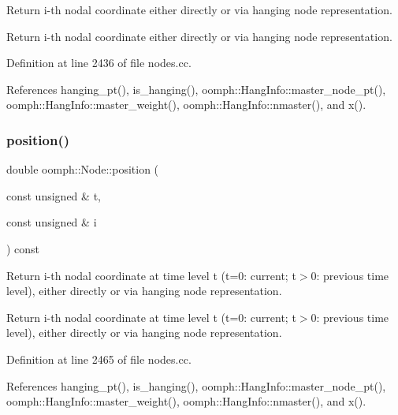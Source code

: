 Return i-\/th nodal coordinate either directly or via hanging node representation. 

Return i-\/th nodal coordinate either directly or via hanging node representation. 

Definition at line 2436 of file nodes.\+cc.



References hanging\+\_\+pt(), is\+\_\+hanging(), oomph\+::\+Hang\+Info\+::master\+\_\+node\+\_\+pt(), oomph\+::\+Hang\+Info\+::master\+\_\+weight(), oomph\+::\+Hang\+Info\+::nmaster(), and x().

\mbox{\label{classoomph_1_1Node_a9110f050f09e803c37a4dde741ec249f}} 
\subsubsection{\texorpdfstring{position()}{position()}\hspace{0.1cm}{\footnotesize\ttfamily [5/5]}}
{\footnotesize\ttfamily double oomph\+::\+Node\+::position (\begin{DoxyParamCaption}\item[{const unsigned \&}]{t,  }\item[{const unsigned \&}]{i }\end{DoxyParamCaption}) const}



Return i-\/th nodal coordinate at time level t (t=0\+: current; t$>$0\+: previous time level), either directly or via hanging node representation. 

Return i-\/th nodal coordinate at time level t (t=0\+: current; t$>$0\+: previous time level), either directly or via hanging node representation. 

Definition at line 2465 of file nodes.\+cc.



References hanging\+\_\+pt(), is\+\_\+hanging(), oomph\+::\+Hang\+Info\+::master\+\_\+node\+\_\+pt(), oomph\+::\+Hang\+Info\+::master\+\_\+weight(), oomph\+::\+Hang\+Info\+::nmaster(), and x().

\mbox{\label{classoomph_1_1Node_aa8974c69837b6909158054ecb70a64e2}} 
